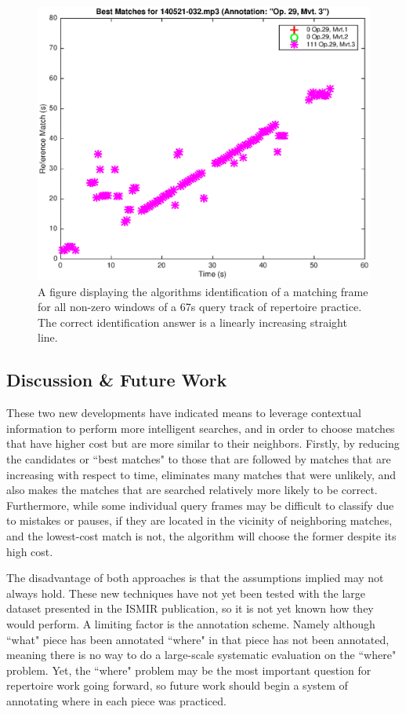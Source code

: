 \documentclass{article}
\begin{document}
\begin{figure}[ht!]
\includegraphics[width=\linewidth]{figs/afterReduction.eps}
\caption{A figure displaying the algorithms identification of a matching frame for all non-zero windows of a 67s query track of repertoire practice. The correct identification answer is a linearly increasing straight line.}
\label{fig:afterReduction}
\end{figure}

\subsection{Discussion \& Future Work}

These two new developments have indicated means to leverage contextual information to perform more intelligent searches, and in order to choose matches that have higher cost but are more similar to their neighbors. Firstly, by reducing the candidates or ``best matches" to those that are followed by matches that are increasing with respect to time, eliminates many matches that were unlikely, and also makes the matches that are searched relatively more likely to be correct. Furthermore, while some individual query frames may be difficult to classify due to mistakes or pauses, if they are located in the vicinity of neighboring matches, and the lowest-cost match is not, the algorithm will choose the former despite its high cost. 

The disadvantage of both approaches is that the assumptions implied may not always hold.  These new techniques have not yet been tested with the large dataset presented in the ISMIR publication, so it is not yet known how they would perform. A limiting factor is the annotation scheme. Namely although ``what" piece has been annotated ``where" in that piece has not been annotated, meaning there is no way to do a large-scale systematic evaluation on the ``where" problem. Yet, the ``where" problem may be the most important question for repertoire work going forward, so future work should begin a system of annotating where in each piece was practiced.   
\end{document}
